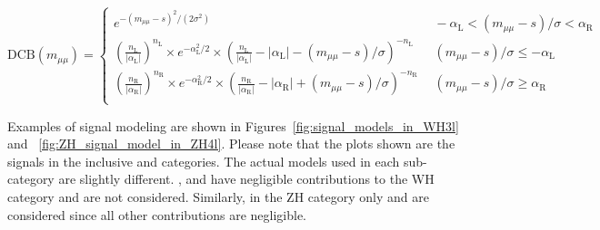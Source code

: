 \begin{equation}
  \label{eq:dCBFunction}
  \text{DCB}(m_{\mu\mu})=%
    \begin{cases}
        e^{-(m_{\mu\mu} - s)^{2}/(2\sigma^{2})} & \ \ -\alpha_{\mathrm{L}} < (m_{\mu\mu}-s)/\sigma < \alpha_{\mathrm{R}} \\
        (\frac{n_{\mathrm{L}}}{|\alpha_{\mathrm{L}}|})^{n_{\mathrm{L}}} \times e^{-\alpha^{2}_{\mathrm{L}}/2} \times (\frac{n_{\mathrm{L}}}{|\alpha_{\mathrm{L}}|} - |\alpha_{\mathrm{L}}| - (m_{\mu\mu}-s)/\sigma)^{-n_{\mathrm{L}}}
        & \ \ (m_{\mu\mu}-s)/\sigma \leq -\alpha_{\mathrm{L}} \\
        (\frac{n_{\mathrm{R}}}{|\alpha_{\mathrm{R}}|})^{n_{\mathrm{R}}} \times e^{-\alpha^{2}_{\mathrm{R}}/2} \times (\frac{n_{\mathrm{R}}}{|\alpha_{\mathrm{R}}|} - |\alpha_{\mathrm{R}}| + (m_{\mu\mu}-s)/\sigma)^{-n_{\mathrm{R}}}
        & \ \ (m_{\mu\mu}-s)/\sigma \geq \alpha_{\mathrm{R}} \\
    \end{cases}
\end{equation}

Examples of signal modeling are shown in Figures~\ref{fig:signal_models_in_WH3l} and ~\ref{fig:ZH_signal_model_in_ZH4l}. 
Please note that the plots shown are the signals in the inclusive \WH and \ZH categories. 
The actual models used in each sub-category are slightly different. 
\ggH, \qqH and \bbH have negligible contributions to the WH category and are not considered.  
Similarly, in the ZH category only \qqZH and \ggZH are considered since all other contributions are negligible. 

